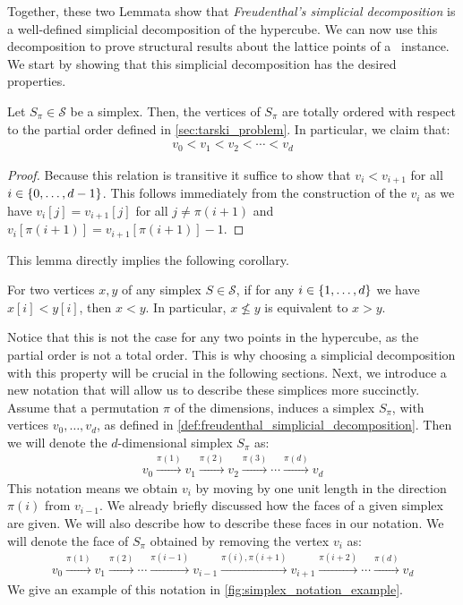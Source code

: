Together, these two Lemmata show that \textit{Freudenthal's simplicial decomposition} is a well-defined simplicial decomposition of the hypercube. We can now use this decomposition to prove structural results about the lattice points of a \Tarski\ instance. We start by showing that this simplicial decomposition has the desired properties.
\begin{lemma}\label{lem:total_order_freudenthal}
	Let $S_{\pi} \in \mathcal{S}$ be a simplex. Then, the vertices of $S_{\pi}$ are totally ordered with respect to the partial order defined in \cref{sec:tarski_problem}. In particular, we claim that:
	\begin{align*}
		v_0 < v_1 < v_2 < \cdots < v_d
	\end{align*}
\end{lemma}
\begin{proof}
	Because this relation is transitive it suffice to show that $v_i < v_{i+1}$ for all $i \in \left\{0, \dots, d-1\right\}$. This follows immediately from the construction of the $v_i$ as we have $v_i[j] = v_{i+1}[j]$ for all $j \neq \pi(i+1)$ and $v_i[\pi(i+1)] = v_{i+1}[\pi(i+1)] - 1$.
\end{proof}
This lemma directly implies the following corollary.
\begin{corollary}\label{cor:total_ordering}
	For two vertices $x,y$ of any simplex $S \in \mathcal{S}$, if for any $i \in \left\{1, \dots, d\right\}$ we have $x[i] < y[i]$, then $x < y$. In particular, $x \not\leq y$ is equivalent to $x > y$.
\end{corollary}
Notice that this is not the case for any two points in the hypercube, as the partial order is not a total order. This is why choosing a simplicial decomposition with this property will be crucial in the following sections. Next, we introduce a new notation that will allow us to describe these simplices more succinctly. Assume that a permutation $\pi$ of the dimensions, induces a simplex $S_{\pi}$, with vertices $v_0, \dots, v_d$, as defined in \cref{def:freudenthal_simplicial_decomposition}. Then we will denote the $d$-dimensional simplex $S_{\pi}$ as:
\begin{align*}
	v_0 \xrightarrow{\pi(1)} v_1 \xrightarrow{\pi(2)} v_2 \xrightarrow{\pi(3)} \cdots \xrightarrow{\pi(d)} v_d
\end{align*}
This notation means we obtain $v_i$ by moving by one unit length in the direction $\pi(i)$ from $v_{i-1}$. We already briefly discussed how the faces of a given simplex are given. We will also describe how to describe these faces in our notation. We will denote the face of $S_{\pi}$ obtained by removing the vertex $v_i$ as:
\begin{align*}
	v_0 \xrightarrow{\pi(1)} v_1 \xrightarrow{\pi(2)} \cdots \xrightarrow{\pi(i - 1)} v_{i-1} \xrightarrow{\pi(i), \pi(i+1)} v_{i+1} \xrightarrow{\pi(i+2)} \cdots \xrightarrow{\pi(d)} v_d
\end{align*}
We give an example of this notation in \cref{fig:simplex_notation_example}.

